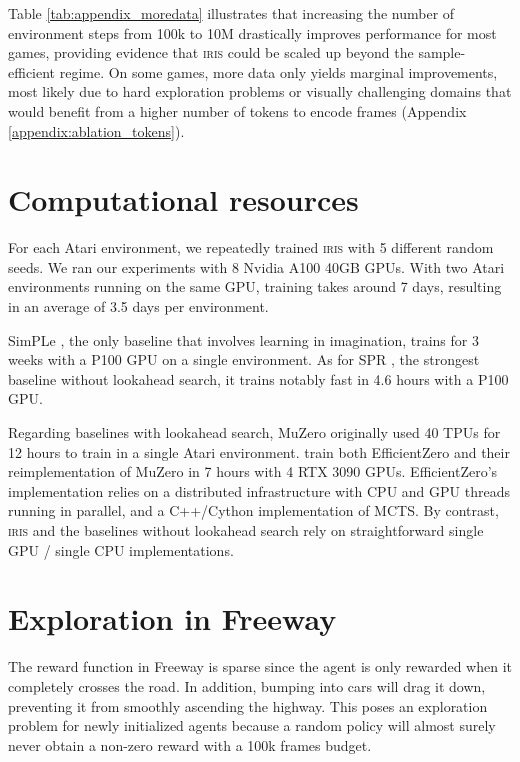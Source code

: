 

Table \ref{tab:appendix_moredata} illustrates that increasing the number of environment steps from 100k to 10M drastically improves performance for most games, providing evidence that \textsc{iris} could be scaled up beyond the sample-efficient regime. On some games, more data only yields marginal improvements, most likely due to hard exploration problems or visually challenging domains that would benefit from a higher number of tokens to encode frames (Appendix \ref{appendix:ablation_tokens}).

\newpage 

\section{Computational resources}
\label{appendix:resources}

For each Atari environment, we repeatedly trained \textsc{iris} with 5 different random seeds. We ran our experiments with 8 Nvidia A100 40GB GPUs. With two Atari environments running on the same GPU, training takes around 7 days, resulting in an average of 3.5 days per environment.

SimPLe \citep{simple}, the only baseline that involves learning in imagination, trains for 3 weeks with a P100 GPU on a single environment. As for SPR \citep{spr}, the strongest baseline without lookahead search, it trains notably fast in 4.6 hours with a P100 GPU. 

Regarding baselines with lookahead search, MuZero \citep{muzero} originally used 40 TPUs for 12 hours to train in a single Atari environment. \citet{efficientzero} train both EfficientZero and their reimplementation of MuZero in 7 hours with 4 RTX 3090 GPUs. EfficientZero's implementation relies on a distributed infrastructure with CPU and GPU threads running in parallel, and a C++/Cython implementation of MCTS. By contrast, \textsc{iris} and the baselines without lookahead search rely on straightforward single GPU / single CPU implementations.

\vspace{1cm}

\section{Exploration in Freeway}
\label{appendix:freeway}

The reward function in Freeway is sparse since the agent is only rewarded when it completely crosses the road. In addition, bumping into cars will drag it down, preventing it from smoothly ascending the highway. This poses an exploration problem for newly initialized agents because a random policy will almost surely never obtain a non-zero reward with a 100k frames budget.

